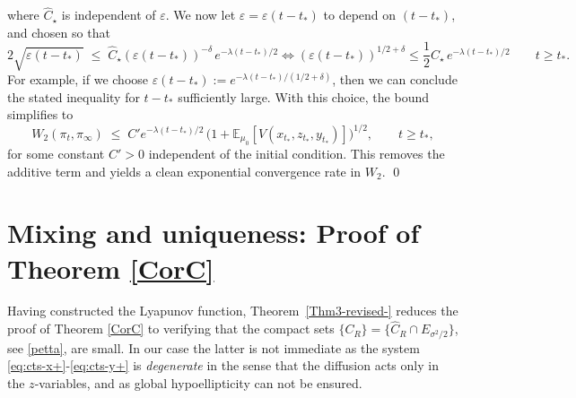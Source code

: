 \documentclass[11pt, a4paper,leqno]{amsart}
\theoremstyle{definition}
\numberwithin{equation}{section}
\begin{document}
where $ \hat C_\star$ is independent of $\varepsilon$. We now let $\varepsilon=\varepsilon(t-t_\ast)$ to depend on $(t-t_\ast)$, and chosen so that
\[
2\sqrt{\varepsilon(t-t_\ast)} \;\le\;  \hat C_\star(\varepsilon(t-t_\ast))^{-\delta}\,e^{-\lambda (t-t_\ast)/2} \Longleftrightarrow  (\varepsilon(t-t_\ast))^{1/2+\delta}\leq
\frac 1 2 C_\star\,e^{-\lambda (t-t_\ast)/2}\qquad t\ge t_\ast.
\]
For example, if we choose $\varepsilon(t-t_\ast):=e^{-\lambda (t-t_\ast)/(1/2+\delta)}$,  then we can conclude the stated inequality  for $t-t_\ast$ sufficiently large. With this choice, the bound simplifies to
\[
W_2(\pi_t,\pi_\infty)
\;\le\; C'e^{-\lambda (t-t_\ast)/2}\,\bigl(1+\mathbb E_{\mu_0}[V(x_{t_\ast},z_{t_\ast},y_{t_\ast})]\bigr)^{1/2},
\qquad t\ge t_\ast,
\]
for some constant $C'>0$ independent of the initial condition.
This removes the additive term and yields a clean exponential convergence rate in $W_2$. \qed









\section{Mixing and uniqueness: Proof of  Theorem \ref{CorC}}\label{sec:proof-CorC}



Having constructed the Lyapunov function, Theorem~\ref{Thm3-revised-} reduces the proof of Theorem \ref{CorC} to verifying that
the compact sets $\{C_R\}=\{\hat C_R\cap E_{\sigma^2/2}\}$, see \eqref{petta}, are small. In our case the latter is not immediate as the system
\eqref{eq:cts-x+}-\eqref{eq:cts-y+}
is \emph{degenerate} in the sense that the diffusion acts only in the $z$-variables, and as global hypoellipticity can not be ensured.
\end{document}
